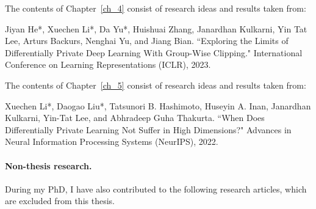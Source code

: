 \noindent The contents of Chapter~\ref{ch_4} consist of research ideas and results taken from:

\begin{mdframed}[leftline=true, topline=false, rightline=false, bottomline=false, linewidth=2pt]
Jiyan He*, Xuechen Li*, Da Yu*, Huishuai Zhang, Janardhan Kulkarni, Yin Tat Lee, Arturs Backurs, Nenghai Yu, and Jiang Bian. ``Exploring the Limits of Differentially Private Deep Learning With Group-Wise Clipping." International Conference on Learning Representations (ICLR), 2023.~\cite{he2022exploring}
\end{mdframed}

\noindent The contents of Chapter~\ref{ch_5} consist of research ideas and results taken from:

\begin{mdframed}[leftline=true, topline=false, rightline=false, bottomline=false, linewidth=2pt]
Xuechen Li*, Daogao Liu*, Tatsunori B. Hashimoto, Huseyin A. Inan, Janardhan Kulkarni, Yin-Tat Lee, and Abhradeep Guha Thakurta. ``When Does Differentially Private Learning Not Suffer in High Dimensions?" Advances in Neural Information Processing Systems (NeurIPS), 2022.~\cite{li2022does}
\end{mdframed}


\newpage
\paragraph{Non-thesis research.}
During my PhD, I have also contributed to the following research articles, which are excluded from this thesis.


